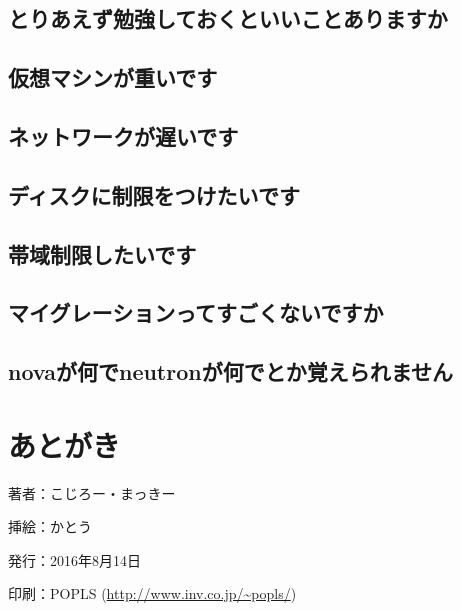 \documentclass[9pt,b5paper,tombo,openany]{jsbook}
\begin{document}
\section*{とりあえず勉強しておくといいことありますか}
\section*{仮想マシンが重いです}
\section*{ネットワークが遅いです}
\section*{ディスクに制限をつけたいです}
\section*{帯域制限したいです}
\section*{マイグレーションってすごくないですか}
\section*{novaが何でneutronが何でとか覚えられません}

\chapter{あとがき}

\thispagestyle{empty}
\begin{flushright}
	\begin{minipage}{0.5\hsize}
		\begin{description}
			\item{著者：}こじろー・まっきー
			\item{挿絵：}かとう
			\item{発行：}2016年8月14日
			\item{印刷：}POPLS (\url{http://www.inv.co.jp/~popls/})
		\end{description}
	\end{minipage}
\end{flushright}
\end{document}
